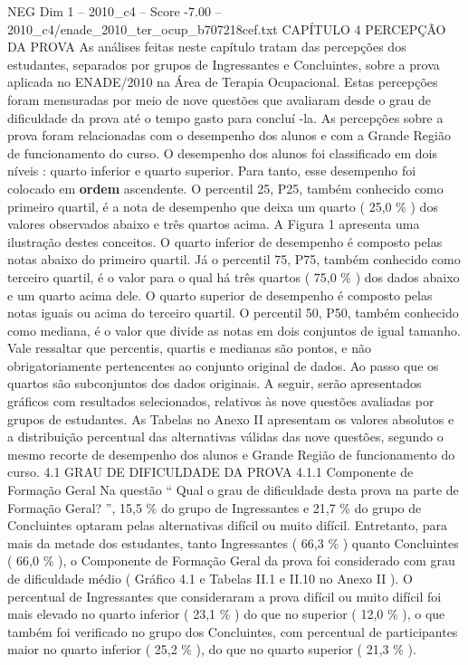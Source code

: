 \begin{textsample}{NEG Dim 1 – 2010\_c4 – Score -7.00 – 2010\_c4/enade\_2010\_ter\_ocup\_b707218cef.txt}  \label{ex:f1_neg_037}
CAPÍTULO 4 PERCEPÇÃO DA PROVA As análises feitas neste capítulo tratam das percepções dos estudantes, separados por grupos de Ingressantes e Concluintes, sobre a prova aplicada no ENADE/2010 na Área de Terapia Ocupacional.
Estas percepções foram mensuradas por meio de nove questões que avaliaram desde o grau de dificuldade da prova até o tempo gasto para concluí -la.
As percepções sobre a prova foram relacionadas com o desempenho dos alunos e com a Grande Região de funcionamento do curso.
O desempenho dos alunos foi classificado em dois níveis : quarto inferior e quarto superior.
Para tanto, esse desempenho foi colocado em \textbf{ordem} ascendente.
O percentil 25, P25, também conhecido como primeiro quartil, é a nota de desempenho que deixa um quarto ( 25,0 \% ) dos valores observados abaixo e três quartos acima.
A Figura 1 apresenta uma ilustração destes conceitos.
O quarto inferior de desempenho é composto pelas notas abaixo do primeiro quartil.
Já o percentil 75, P75, também conhecido como terceiro quartil, é o valor para o qual há três quartos ( 75,0 \% ) dos dados abaixo e um quarto acima dele.
O quarto superior de desempenho é composto pelas notas iguais ou acima do terceiro quartil.
O percentil 50, P50, também conhecido como mediana, é o valor que divide as notas em dois conjuntos de igual tamanho.
Vale ressaltar que percentis, quartis e medianas são pontos, e não obrigatoriamente pertencentes ao conjunto original de dados.
Ao passo que os quartos são subconjuntos dos dados originais.
A seguir, serão apresentados gráficos com resultados selecionados, relativos às nove questões avaliadas por grupos de estudantes.
As Tabelas no Anexo II apresentam os valores absolutos e a distribuição percentual das alternativas válidas das nove questões, segundo o mesmo recorte de desempenho dos alunos e Grande Região de funcionamento do curso. 4.1 GRAU DE DIFICULDADE DA PROVA 4.1.1 Componente de Formação Geral Na questão “ Qual o grau de dificuldade desta prova na parte de Formação Geral? ”, 15,5 \% do grupo de Ingressantes e 21,7 \% do grupo de Concluintes optaram pelas alternativas difícil ou muito difícil.
Entretanto, para mais da metade dos estudantes, tanto Ingressantes ( 66,3 \% ) quanto Concluintes ( 66,0 \% ), o Componente de Formação Geral da prova foi considerado com grau de dificuldade médio ( Gráfico 4.1 e Tabelas II.1 e II.10 no Anexo II ).
O percentual de Ingressantes que consideraram a prova difícil ou muito difícil foi mais elevado no quarto inferior ( 23,1 \% ) do que no superior ( 12,0 \% ), o que também foi verificado no grupo dos Concluintes, com percentual de participantes maior no quarto inferior ( 25,2 \% ), do que no quarto superior ( 21,3 \% ).

\end{textsample}

